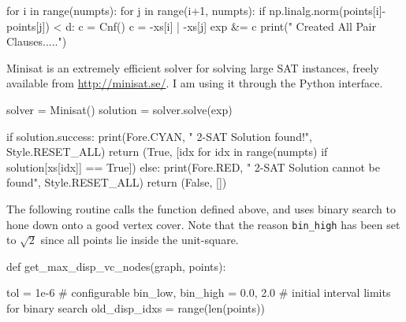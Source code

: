 \nwenddocs{}\endmoddef\nwstartdeflinemarkup{}\nwenddeflinemarkup
for i in range(numpts):
    for j in range(i+1, numpts):
        if np.linalg.norm(points[i]-points[j]) < d:
               c = Cnf()
               c = -xs[i] | -xs[j]
               exp &= c
print("     Created All Pair Clauses.....")
\nwendcode{}\nwdocspar

Minisat is an extremely efficient solver for solving large SAT instances, freely 
available from \url{http://minisat.se/}. I am using it through the Python interface. 

\nwenddocs{}\endmoddef\nwstartdeflinemarkup{}\nwenddeflinemarkup
solver = Minisat()
solution = solver.solve(exp)

if solution.success:
        print(Fore.CYAN, "    2-SAT Solution found!", Style.RESET_ALL)
        return (True, [idx for idx in range(numpts) if solution[xs[idx]] == True])
else: 
         print(Fore.RED, "    2-SAT Solution cannot be found", Style.RESET_ALL)
         return (False, [])
\nwendcode{}\nwdocspar


The following routine calls the function defined above, and uses binary search to hone
down onto a good vertex cover. Note that the reason \verb|bin_high| has been set to $\sqrt{2}$
since all points lie inside the unit-square. 


\nwenddocs{}\plusendmoddef\nwstartdeflinemarkup{}\nwenddeflinemarkup
def get_max_disp_vc_nodes(graph, points):

      tol               = 1e-6     # configurable
      bin_low, bin_high = 0.0, 2.0 # initial interval limits for binary search
      old_disp_idxs     = range(len(points)) 

